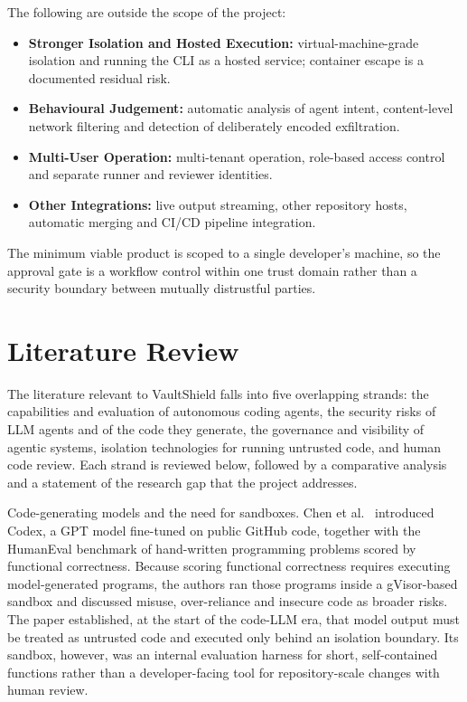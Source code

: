 \documentclass[12pt,a4paper,oneside]{report}
\providecommand{\tightlist}{\setlength{\itemsep}{0pt}\setlength{\parskip}{0pt}}
\begin{document}
The following are outside the scope of the project:

\begin{itemize}
\tightlist
\item
  \textbf{Stronger Isolation and Hosted Execution:} virtual-machine-grade isolation and running the CLI as a hosted service; container escape is a documented residual risk.
\item
  \textbf{Behavioural Judgement:} automatic analysis of agent intent, content-level network filtering and detection of deliberately encoded exfiltration.
\item
  \textbf{Multi-User Operation:} multi-tenant operation, role-based access control and separate runner and reviewer identities.
\item
  \textbf{Other Integrations:} live output streaming, other repository hosts, automatic merging and CI/CD pipeline integration.
\end{itemize}

The minimum viable product is scoped to a single developer's machine, so the approval gate is a workflow control within one trust domain rather than a security boundary between mutually distrustful parties.

\clearpage

\chapter{Literature Review}\label{literature-review}

The literature relevant to VaultShield falls into five overlapping strands: the capabilities and evaluation of autonomous coding agents, the security risks of LLM agents and of the code they generate, the governance and visibility of agentic systems, isolation technologies for running untrusted code, and human code review. Each strand is reviewed below, followed by a comparative analysis and a statement of the research gap that the project addresses.

Code-generating models and the need for sandboxes. Chen et al.~\cite{ref1} introduced Codex, a GPT model fine-tuned on public GitHub code, together with the HumanEval benchmark of hand-written programming problems scored by functional correctness. Because scoring functional correctness requires executing model-generated programs, the authors ran those programs inside a gVisor-based sandbox and discussed misuse, over-reliance and insecure code as broader risks. The paper established, at the start of the code-LLM era, that model output must be treated as untrusted code and executed only behind an isolation boundary. Its sandbox, however, was an internal evaluation harness for short, self-contained functions rather than a developer-facing tool for repository-scale changes with human review.
\end{document}

